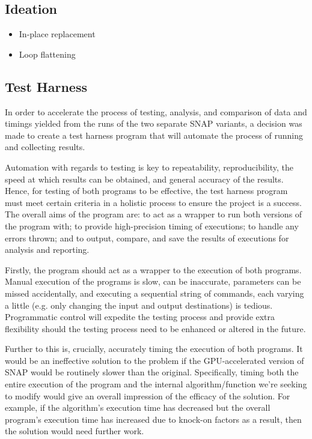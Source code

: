 \documentclass[conference]{IEEEtran}
\begin{document}
\subsection{Ideation}

\begin{itemize}
    \item In-place replacement
    \item Loop flattening
\end{itemize}

\subsection{Test Harness}

In order to accelerate the process of testing, analysis, and comparison of data and timings yielded from the runs of the two separate SNAP variants, a decision was made to create a test harness program that will automate the process of running and collecting results.

Automation with regards to testing is key to repeatability, reproducibility, the speed at which results can be obtained, and general accuracy of the results. Hence, for testing of both programs to be effective, the test harness program must meet certain criteria in a holistic process to ensure the project is a success. The overall aims of the program are: to act as a wrapper to run both versions of the program with; to provide high-precision timing of executions; to handle any errors thrown; and to output, compare, and save the results of executions for analysis and reporting.

Firstly, the program should act as a wrapper to the execution of both programs. Manual execution of the programs is slow, can be inaccurate, parameters can be missed accidentally, and executing a sequential string of commands, each varying a little (e.g. only changing the input and output destinations) is tedious. Programmatic control will expedite the testing process and provide extra flexibility should the testing process need to be enhanced or altered in the future.

Further to this is, crucially, accurately timing the execution of both programs. It would be an ineffective solution to the problem if the GPU-accelerated version of SNAP would be routinely slower than the original. Specifically, timing both the entire execution of the program and the internal algorithm/function we're seeking to modify would give an overall impression of the efficacy of the solution. For example, if the algorithm's execution time has decreased but the overall program's execution time has increased due to knock-on factors as a result, then the solution would need further work.
\end{document}
